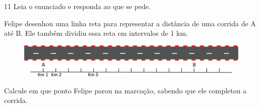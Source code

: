 \num{11} Leia o enunciado e responda ao que se pede. 

\vspace{1em}

Felipe desenhou uma linha reta para representar a distância de uma corrida de A até B. Ele também dividiu essa reta em intervalos de 1 km. 

\vspace{1em}

\begin{figure}[htpb!]
\centering
\includegraphics[width=\textwidth]{./media/image6.png}
\end{figure}

\vspace{1em}

\begin{escolha}
\item Calcule em que ponto Felipe parou na marcação, sabendo que ele completou a corrida.\\
\end{escolha}


